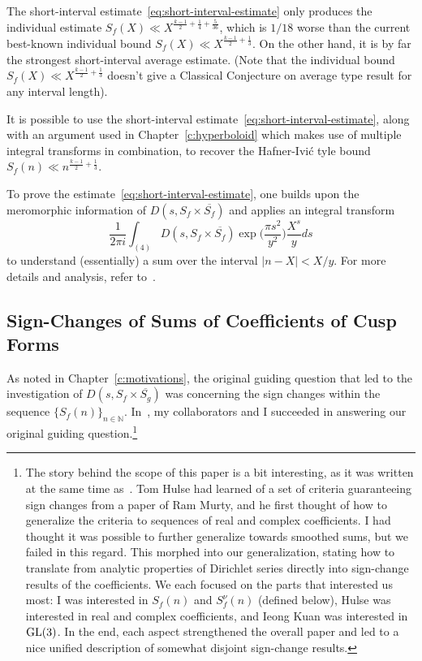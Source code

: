 The short-interval estimate~\eqref{eq:short-interval-estimate} only produces the
individual estimate $S_f(X) \ll X^{\frac{k-1}{2} + \frac{1}{4} + \frac{5}{36}}$, which is
$1/18$ worse than the current best-known individual bound $S_f(X) \ll X^{\frac{k-1}{2} +
\frac{1}{3}}$.
On the other hand, it is by far the strongest short-interval average estimate.
(Note that the individual bound $S_f(X) \ll X^{\frac{k-1}{2} + \frac{1}{3}}$ doesn't give
a Classical Conjecture on average type result for any interval length).


\begin{remark}
  It is possible to use the short-interval estimate~\eqref{eq:short-interval-estimate},
  along with an argument used in Chapter~\ref{c:hyperboloid} which makes use of multiple
  integral transforms in combination, to recover the Hafner-Ivi\'c tyle bound $S_f(n) \ll
  n^{\frac{k-1}{2} + \frac{1}{3}}$.
\end{remark}


To prove the estimate~\eqref{eq:short-interval-estimate}, one builds upon the meromorphic
information of $D(s, S_f \times \overline{S_f})$ and applies an integral transform
\begin{equation}
  \frac{1}{2\pi i} \int_{(4)} D(s, S_f \times \overline{S_f}) \exp{\Big(\frac{\pi
  s^2}{y^2} \Big)} \frac{X^s}{y} ds
\end{equation}
to understand (essentially) a sum over the interval $\lvert n - X \rvert < X/y$.
For more details and analysis, refer to~\cite{hkldwShort}.


\subsection*{Sign-Changes of Sums of Coefficients of Cusp Forms}

As noted in Chapter~\ref{c:motivations}, the original guiding question that led to the
investigation of $D(s, S_f \times \overline{S_g})$ was concerning the sign changes within
the sequence $\{S_f(n)\}_{n \in \mathbb{N}}$.
In~\cite{hkldwSigns}, my collaborators and I succeeded in answering our original guiding
question.\footnote{The story behind the scope of this paper is a bit interesting, as it
  was written at the same time as~\cite{hkldwShort}.
  Tom Hulse had learned of a set of criteria guaranteeing sign changes from a paper of Ram
  Murty, and he first thought of how to generalize the criteria to sequences of real and
  complex coefficients.
  I had thought it was possible to further generalize towards smoothed sums, but we failed
  in this regard.
  This morphed into our generalization, stating how to translate from analytic properties
  of Dirichlet series directly into sign-change results of the coefficients.
We each focused on the parts that interested us most: I was interested in $S_f(n)$ and
$S_f^\nu(n)$ (defined below), Hulse was interested in real and complex coefficients, and
Ieong Kuan was interested in $\operatorname{GL}(3)$.
In the end, each aspect strengthened the overall paper and led to a nice unified
description of somewhat disjoint sign-change results.}

